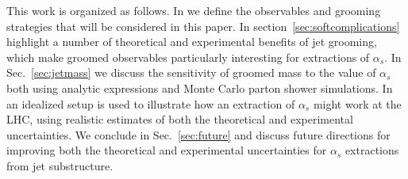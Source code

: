 This work is organized as follows. In  we define the observables and grooming strategies that will be considered in this paper. In section~\ref{sec:softcomplications} highlight a number of theoretical and experimental benefits of jet grooming, which make groomed observables particularly interesting for extractions of $\alpha_s$. In Sec.~\ref{sec:jetmass} we discuss the sensitivity of groomed mass to the value of $\alpha_s$ both using analytic expressions and Monte Carlo parton shower simulations.   In  an idealized setup is used to illustrate how an extraction of $\alpha_s$ might work at the LHC, using realistic estimates of both the theoretical and experimental uncertainties.  We conclude in Sec.~\ref{sec:future} and discuss future directions for improving both the theoretical and experimental uncertainties for $\alpha_s$ extractions from jet substructure.

\begin{comment}
\begin{itemize}
\item Laying the groundwork for high precision ($\mathcal{O}(1\%)$) extractions of $\alpha_s$ for the full LHC dataset or a future $e^+e^-$ machine.
\item Competitive measurements with existing LHC extractions of $\alpha_s$ (5\%)
\item Probing the tension between thrust (and friends) extractions with lattice (10\%)
\item Parton shower MC (15\%)
\end{itemize}
\end{comment}







